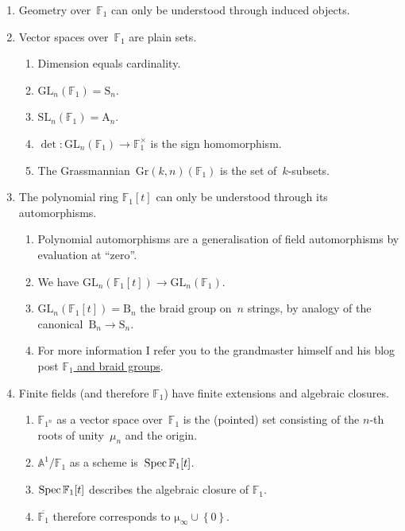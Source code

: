 \begin{enumerate}
  \item Geometry over~$\mathbb{F}_1$ can only be understood through induced objects.
    \item Vector spaces over~$\mathbb{F}_1$ are plain sets.
      \begin{enumerate}
        \item Dimension equals cardinality.
        \item $\mathrm{GL}_n(\mathbb{F}_1)=\mathrm{S}_n$.
        \item $\mathrm{SL}_n(\mathbb{F}_1)=\mathrm{A}_n$.
        \item $\det\colon\mathrm{GL}_n(\mathbb{F}_1)\to\mathbb{F}_1^\times$ is the sign homomorphism.
        \item The Grassmannian~$\mathrm{Gr}(k,n)(\mathbb{F}_1)$ is the set of~$k$-subsets.
      \end{enumerate}

    \item The polynomial ring $\mathbb{F}_1[t]$ can only be understood through its automorphisms.
      \begin{enumerate}
        \item Polynomial automorphisms are a generalisation of field automorphisms by evaluation at ``zero''.
        \item We have $\mathrm{GL}_n(\mathbb{F}_1[t])\to\mathrm{GL}_n(\mathbb{F}_1)$.
        \item $\mathrm{GL}_n(\mathbb{F}_1[t])=\mathrm{B}_n$ the braid group on~$n$ strings, by analogy of the canonical~$\mathrm{B}_n\to\mathrm{S}_n$.
        \item For more information I refer you to the grandmaster himself and his blog post \href{http://www.neverendingbooks.org/index.php/f_un-and-braid-groups.html}{$\mathbb{F}_1$ and braid groups}.
      \end{enumerate}

    \item Finite fields (and therefore $\mathbb{F}_1$) have finite extensions and algebraic closures.
      \begin{enumerate}
        \item $\mathbb{F}_{1^n}$ as a vector space over~$\mathbb{F}_1$ is the (pointed) set consisting of the $n$-th roots of unity~$\mu_n$ and the origin.
        \item $\mathbb{A}^1/\mathbb{F}_1$ as a scheme is~$\operatorname{Spec}\mathbb{F}_1[t]$.
        \item $\operatorname{Spec}\mathbb{F}_1[t]$ describes the algebraic closure of $\mathbb{F}_1$.
        \item $\overline{\mathbb{F}_1}$ therefore corresponds to $\mathrm{\mu}_\infty\cup\left\{ 0 \right\}$.
      \end{enumerate}


\end{enumerate}
